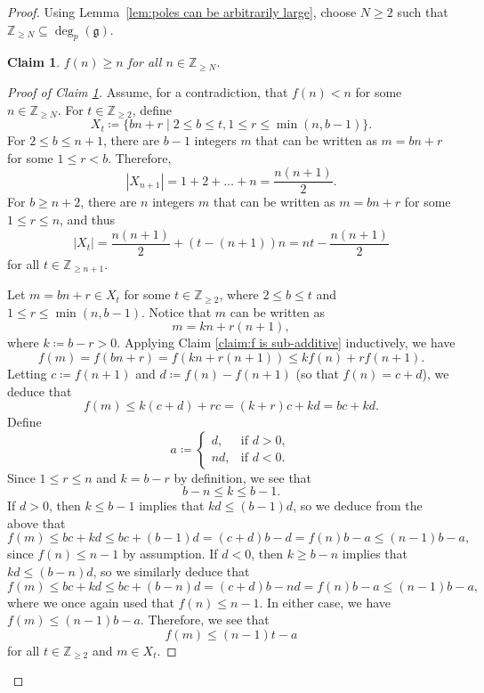 \documentclass[10pt,a4paper]{amsart}
\newtheorem{claim}{Claim}
\def\ZZ{\mathbb{Z}}
\def\g{\mathfrak{g}}
\begin{document}
\begin{proof}
    Using Lemma~\ref{lem:poles can be arbitrarily large}, choose $N \geq 2$ such that $\ZZ_{\geq N} \subseteq \deg_p(\g)$.

    \begin{claim}\label{claim:f is increasing}
        $f(n) \geq n$ for all $n \in \ZZ_{\geq N}$.
    \end{claim}
    \begin{proof}[Proof of Claim \ref{claim:f is increasing}]
        Assume, for a contradiction, that $f(n) < n$ for some $n \in \ZZ_{\geq N}$. For $t \in \ZZ_{\geq 2}$, define
        $$X_t \coloneqq \{b n + r \mid 2 \leq b \leq t, 1 \leq r \leq \min(n,b - 1)\}.$$
        For $2 \leq b \leq n + 1$, there are $b - 1$ integers $m$ that can be written as $m = b n + r$ for some $1 \leq r < b$. Therefore,
        $$|X_{n + 1}| = 1 + 2 + \dots + n = \frac{n(n + 1)}{2}.$$
        For $b \geq n + 2$, there are $n$ integers $m$ that can be written as $m = b n + r$ for some $1 \leq r \leq n$, and thus
        $$|X_t| = \frac{n(n + 1)}{2} + (t - (n + 1))n = n t - \frac{n(n + 1)}{2}$$
        for all $t \in \ZZ_{\geq n + 1}$.
        
        Let $m = b n + r \in X_t$ for some $t \in \ZZ_{\geq 2}$, where $2 \leq b \leq t$ and $1 \leq r \leq \min(n, b - 1)$. Notice that $m$ can be written as
        $$m = k n + r(n + 1),$$
        where $k \coloneqq b - r > 0$. Applying Claim \ref{claim:f is sub-additive} inductively, we have
        $$f(m) = f(b n + r) = f(k n + r (n + 1)) \leq k f(n) + r f(n + 1).$$
        Letting $c \coloneqq f(n + 1)$ and $d \coloneqq f(n) - f(n + 1)$ (so that $f(n) = c + d$), we deduce that
        $$f(m) \leq k(c + d) + rc = (k + r)c + kd = b c + kd.$$
        Define
        $$a \coloneqq \begin{cases}
            d, &\text{if } d > 0, \\
            nd, &\text{if } d < 0.
        \end{cases}$$
        Since $1 \leq r \leq n$ and $k = b - r$ by definition, we see that
        $$b - n \leq k \leq b - 1.$$
        If $d > 0$, then $k \leq b - 1$ implies that $kd \leq (b - 1)d$, so we deduce from the above that
        $$f(m) \leq bc + kd \leq bc + (b - 1)d = (c + d)b - d = f(n)b - a \leq (n - 1)b - a,$$
        since $f(n) \leq n - 1$ by assumption. If $d < 0$, then $k \geq b - n$ implies that $kd \leq (b - n)d$, so we similarly deduce that
        $$f(m) \leq bc + kd \leq bc + (b - n)d = (c + d)b - nd = f(n)b - a \leq (n - 1)b - a,$$
        where we once again used that $f(n) \leq n - 1$. In either case, we have $f(m) \leq (n - 1)b - a$. Therefore, we see that
        $$f(m) \leq (n - 1)t - a$$
        for all $t \in \ZZ_{\geq 2}$ and $m \in X_t$.


\end{proof}
\end{proof}
\end{document}
